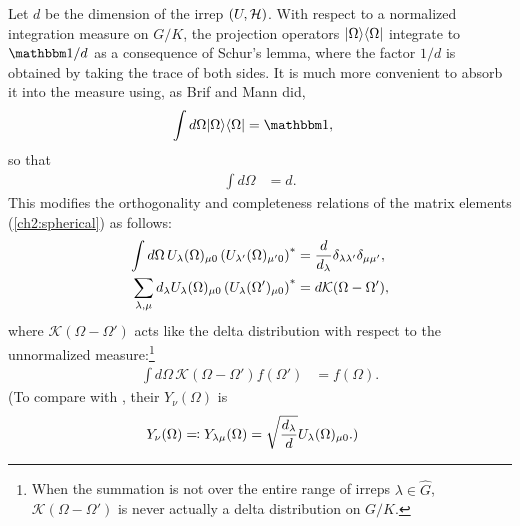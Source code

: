 Let $d$ be the dimension of the irrep $(U,\mathcal{H})$. With respect to a normalized integration measure on $G/K$, the projection operators ${\left\vert{\Omega}\right\rangle}{\left\langle{\Omega}\right\vert}$ integrate to $\id/d$ as a consequence of Schur's lemma, where the factor $1/d$ is obtained by taking the trace of both sides. It is much more convenient to absorb it into the measure using, as Brif and Mann did,
\begin{align}
	\int d\Omega \ket{\Omega}\bra{\Omega} &= \id,
\end{align}
so that
\begin{align}
	\int d\Omega &= d.
\end{align}
This modifies the orthogonality and completeness relations of the matrix elements (\autoref{ch2:spherical}) as follows:
\begin{align}
\int d\Omega\, \rep_{\lambda}(\Omega)_{\mu 0} \left( \rep_{\lambda'}(\Omega)_{\mu' 0} \right)^* &= \frac{d}{d_{\lambda}} \delta_{\lambda\lambda'} \delta_{\mu\mu'}, \label{thm:orthogonality-unnormalized} \\
\sum_{\lambda,\mu} d_{\lambda} \rep_{\lambda}(\Omega)_{\mu 0} \left( \rep_{\lambda}(\Omega')_{\mu 0} \right)^* &= d\mathcal{K}(\Omega - \Omega'), \label{thm:completeness-unnormalized}
\end{align}
where $\mathcal{K}(\Omega - \Omega')$ acts like the delta distribution with respect to the unnormalized measure:\footnote{When the summation is not over the entire range of irreps $\lambda \in \hat{G}$, $\mathcal{K}(\Omega - \Omega')$ is never actually a delta distribution on $G/K$.}
\begin{align}
	\int d\Omega\, \mathcal{K}(\Omega - \Omega') f(\Omega') &= f(\Omega).
\end{align}
(To compare with \cite{brif_phase-space_1999}, their $Y_{\nu}(\Omega)$ is
\begin{align}
	Y_{\nu}(\Omega) \eqqcolon Y_{\lambda \mu} (\Omega) &= \sqrt{\frac{d_{\lambda}}{d}} U_{\lambda}(\Omega)_{\mu 0}.)
\end{align}

